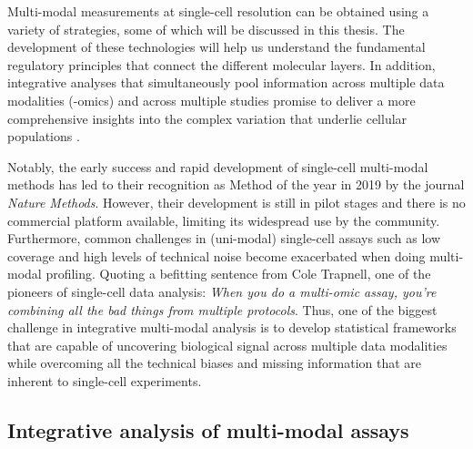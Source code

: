 Multi-modal measurements at single-cell resolution can be obtained using a variety of strategies, some of which will be discussed in this thesis. The development of these technologies will help us understand the fundamental regulatory principles that connect the different molecular layers. In addition, integrative analyses that simultaneously pool information across multiple data modalities (-omics) and across multiple studies promise to deliver a more comprehensive insights into the complex variation that underlie cellular populations \cite{Stuart2019,Colome-Tatche2018}.

Notably, the early success and rapid development of single-cell multi-modal methods has led to their recognition as Method of the year in 2019 by the journal \textit{Nature Methods}. However, their development is still in pilot stages and there is no commercial platform available, limiting its widespread use by the community. Furthermore, common challenges in (uni-modal) single-cell assays such as low coverage and high levels of technical noise become exacerbated when doing multi-modal profiling. Quoting a befitting sentence from Cole Trapnell, one of the pioneers of single-cell data analysis: \textit{When you do a multi-omic assay, you're combining all the bad things from multiple protocols}. Thus, one of the biggest challenge in integrative multi-modal analysis is to develop statistical frameworks that are capable of uncovering biological signal across multiple data modalities while overcoming all the technical biases and missing information that are inherent to single-cell experiments. 


\subsection{Integrative analysis of multi-modal assays}

